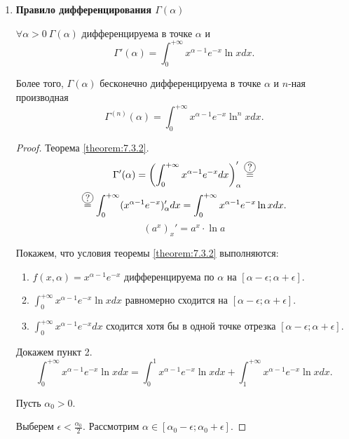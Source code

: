 \begin{enumerate}
    \item \textbf{Правило дифференцирования $ \Gamma(\alpha) $}

          \begin{statement}
              $ \forall \alpha > 0 \ \Gamma(\alpha) $ дифференцируема в точке $ \alpha $ и
              \[
                  \Gamma'(\alpha) = \int_{0}^{+\infty}x^{\alpha-1}e^{-x}\ln x dx.
              \]

              Более того, $ \Gamma(\alpha) $ бесконечно дифференцируема в точке $ \alpha $ и $ n $-ная производная
              \[
                  \Gamma^{(n)}(\alpha) = \int_{0}^{+\infty}x^{\alpha-1}e^{-x}\ln^n x dx.
              \]
          \end{statement}

          \begin{proof}
            Теорема \ref{theorem:7.3.2}.
            \begin{multline*}
                \Gamma'(\alpha) = \left(\int_{0}^{+\infty}x^{\alpha-1}e^{-x}dx\right)_\alpha' \overset{\circled{?}}{=} \\
                \overset{\circled{?}}{=} \int_{0}^{+\infty}(x^{\alpha-1}e^{-x})_\alpha'dx = \int_{0}^{+\infty}x^{\alpha-1}e^{-x}\ln x dx.
            \end{multline*}
            \[
                \boxed{(a^x)_x' = a^x \cdot \ln a}
            \]

            Покажем, что условия теоремы \ref{theorem:7.3.2} выполняются:
            \begin{enumerate}
                \item $ f(x,\alpha)=x^{\alpha-1}e^{-x} $ дифференцируема по $ \alpha $ на $ [\alpha - \epsilon;\alpha + \epsilon] $.
                \item $ \int_{0}^{+\infty}x^{\alpha-1}e^{-x}\ln x dx $ равномерно сходится на $ [\alpha-\epsilon;\alpha+\epsilon] $.
                \item $ \int_{0}^{+\infty}x^{\alpha-1}e^{-x}dx $ сходится хотя бы в одной точке отрезка $ [\alpha-\epsilon;\alpha+\epsilon] $.
            \end{enumerate}

            Докажем пункт 2.
            \[
                \int_{0}^{+\infty}x^{\alpha-1}e^{-x}\ln x dx = \int_{0}^{1}x^{\alpha-1}e^{-x}\ln x dx + \int_{1}^{+\infty}x^{\alpha-1}e^{-x}\ln x dx.
            \]

            Пусть $ \alpha_0 > 0 $.

            Выберем $ \epsilon < \frac{\alpha_0}{2} $. Рассмотрим $ \alpha \in [\alpha_0 - \epsilon;\alpha_0 + \epsilon] $.


\end{proof}
\end{enumerate}
